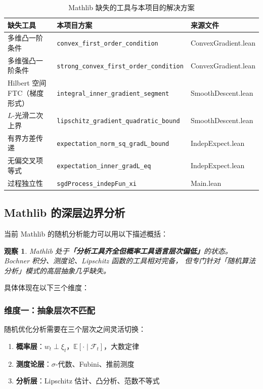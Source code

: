 \documentclass[12pt, a4paper]{article}
\newtheorem{observation}[theorem]{观察}
\newcommand{\E}{\mathbb{E}}
\newcommand{\lean}[1]{\texttt{#1}}
\begin{document}
\begin{table}[H]
\centering
\caption{Mathlib 缺失的工具与本项目的解决方案}
\begin{tabular}{p{4.5cm}p{3.5cm}p{4cm}}
\toprule
\textbf{缺失工具} & \textbf{本项目方案} & \textbf{来源文件} \\
\midrule
多维凸一阶条件 & \lean{convex\_first\_order\_condition} & ConvexGradient.lean \\
多维强凸一阶条件 & \lean{strong\_convex\_first\_order\_condition} & ConvexGradient.lean \\
Hilbert 空间 FTC（梯度形式）& \lean{integral\_inner\_gradient\_segment} & SmoothDescent.lean \\
$L$-光滑二次上界 & \lean{lipschitz\_gradient\_quadratic\_bound} & SmoothDescent.lean \\
有界方差传递 & \lean{expectation\_norm\_sq\_gradL\_bound} & IndepExpect.lean \\
无偏交叉项等式 & \lean{expectation\_inner\_gradL\_eq} & IndepExpect.lean \\
过程独立性 & \lean{sgdProcess\_indepFun\_xi} & Main.lean \\
\bottomrule
\end{tabular}
\end{table}

\subsection{Mathlib 的深层边界分析}

当前 Mathlib 的随机分析能力可以用以下描述概括：

\begin{observation}
Mathlib 处于\textbf{「分析工具齐全但概率工具语言层次偏低」}的状态。
Bochner 积分、测度论、Lipschitz 函数的工具相对完备，
但专门针对「随机算法分析」模式的高层抽象几乎缺失。
\end{observation}

具体体现在以下三个维度：

\subsubsection{维度一：抽象层次不匹配}

随机优化分析需要在三个层次之间灵活切换：
\begin{enumerate}
  \item \textbf{概率层}：$w_t \perp \xi_t$，$\E[\cdot \mid \mathcal{F}_t]$，大数定律
  \item \textbf{测度论层}：$\sigma$-代数、Fubini、推前测度
  \item \textbf{分析层}：Lipschitz 估计、凸分析、范数不等式
\end{enumerate}
\end{document}
